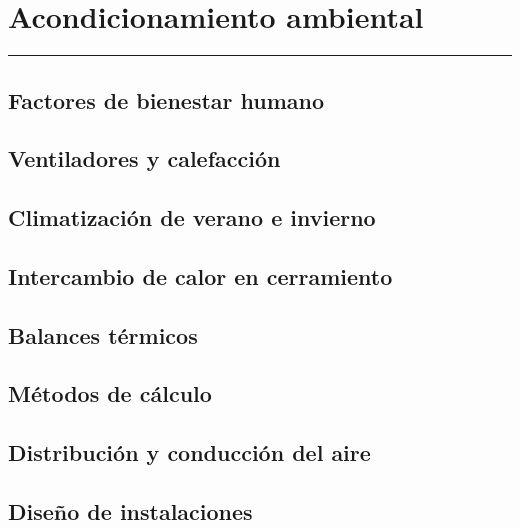 \chapter{Acondicionamiento ambiental}

\vspace{\fill}

\hrule

\vspace{.3cm}

{\large \lipsum[1]} 

\pagestyle{fancy}

\newpage


	\section{Factores de bienestar humano}
	\Biblio{}

	\section{Ventiladores y calefacción}
	\Biblio{}

	\section{Climatización de verano e invierno}
	\Biblio{}

	\section{Intercambio de calor en cerramiento}
	\Biblio{}

	\section{Balances térmicos}
	\Biblio{}

	\section{Métodos de cálculo}
	\Biblio{}

	\section{Distribución y conducción del aire}
	\Biblio{}

	\section{Diseño de instalaciones}
	\Biblio{}

	


\newpage
\pagestyle{empty}